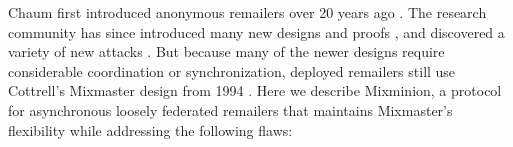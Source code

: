 \documentclass[11pt]{IEEEtran}
\begin{document}
Chaum first introduced anonymous remailers over 20 years ago
\cite{chaum-mix}.
The research community has since introduced many new
designs and proofs
\cite{abe}\cite{babel}\cite{flash-mix}\cite{kesdogan}\cite{shuffle}\cite{hybrid-mix}, 
and discovered a variety of new attacks 
\cite{back-traffic-analysis}\cite{langos02}\cite{disad-free-routes}\cite{desmedt}\cite{mitkuro}\cite{raymond00}.
But because many of the newer designs require considerable coordination or
synchronization, deployed remailers still use Cottrell's Mixmaster
design from 1994 \cite{mixmaster-attacks}\cite{mixmaster-spec}. Here
we describe
Mixminion, a protocol for asynchronous loosely federated remailers that
maintains Mixmaster's flexibility while addressing the following flaws:
\end{document}
